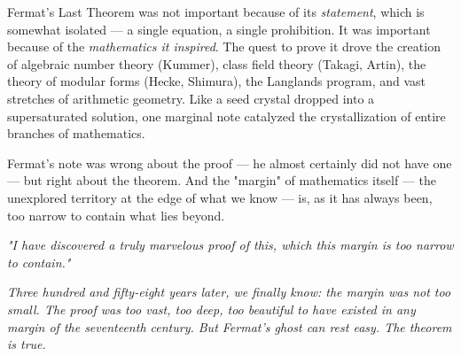 Fermat's Last Theorem was not important because of its \textit{statement}, which is somewhat isolated --- a single equation, a single prohibition. It was important because of the \textit{mathematics it inspired}. The quest to prove it drove the creation of algebraic number theory (Kummer), class field theory (Takagi, Artin), the theory of modular forms (Hecke, Shimura), the Langlands program, and vast stretches of arithmetic geometry. Like a seed crystal dropped into a supersaturated solution, one marginal note catalyzed the crystallization of entire branches of mathematics.

Fermat's note was wrong about the proof --- he almost certainly did not have one --- but right about the theorem. And the "margin" of mathematics itself --- the unexplored territory at the edge of what we know --- is, as it has always been, too narrow to contain what lies beyond.


\ornbreak


\textit{"I have discovered a truly marvelous proof of this, which this margin is too narrow to contain."}

\textit{Three hundred and fifty-eight years later, we finally know: the margin was not too small. The proof was too vast, too deep, too beautiful to have existed in any margin of the seventeenth century. But Fermat's ghost can rest easy. The theorem is true.}

